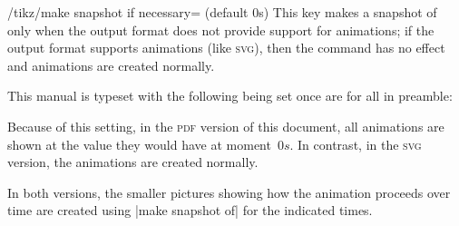 \begin{key}{/tikz/make snapshot if necessary= (default 0s)}
    This key makes a snapshot of  only when the output format does
    not provide support for animations; if the output format supports
    animations (like \textsc{svg}), then the command has no effect and
    animations are created normally.

    This manual is typeset with the following being set once are for all in
    preamble:
\begin{codeexample}
\tikzset{make snapshot if necessary}
\end{codeexample}

    Because of this setting, in the \textsc{pdf} version of this document, all
    animations are shown at the value they would have at moment~$0s$. In
    contrast, in the \textsc{svg} version, the animations are created normally.

    In both versions, the smaller pictures showing how the animation proceeds
    over time are created using |make snapshot of| for the indicated times.
\end{key}


